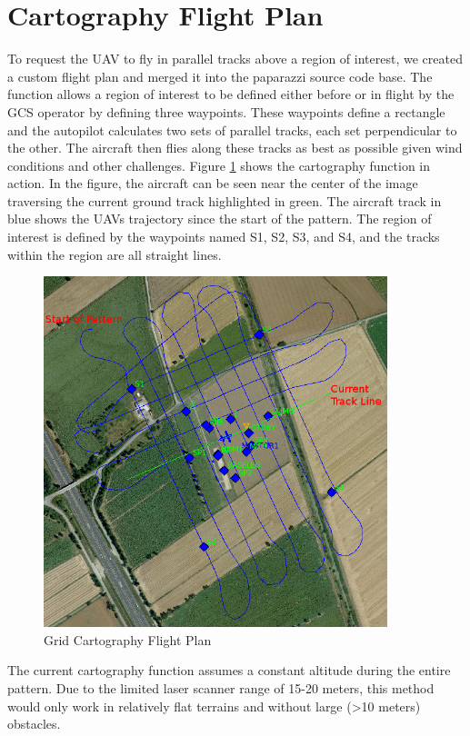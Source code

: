 \documentclass[a4paper,11pt]{report}
\begin{document}
\section{Cartography Flight Plan}

To request the UAV to fly in parallel tracks above a region of interest, we created a custom flight plan and merged it into the paparazzi source code base. The function allows a region of interest to be defined either before or in flight by the GCS operator by defining three waypoints. These waypoints define a rectangle and the autopilot calculates two sets of parallel tracks, each set perpendicular to the other. The aircraft then flies along these tracks as best as possible given wind conditions and other challenges. Figure \ref{fig:gridcarto} shows the cartography function in action. In the figure, the aircraft can be seen near the center of the image traversing the current ground track highlighted in green. The aircraft track in blue shows the UAVs trajectory since the start of the pattern. The region of interest is defined by the waypoints named S1, S2, S3, and S4, and the tracks within the region are all straight lines.

\begin{figure}[ht]
 \centering
 \includegraphics[width=10cm]{pprz_cartography.png}
 \caption{Grid Cartography Flight Plan}
 \label{fig:gridcarto}
\end{figure}

The current cartography function assumes a constant altitude during the entire pattern. Due to the limited laser scanner range of 15-20 meters, this method would only work in relatively flat terrains and without large (>10 meters) obstacles.
\end{document}
